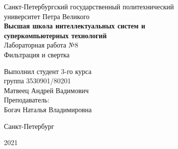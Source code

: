 \documentclass[a4paper]{article}
\begin{document}
    \begin{center}
        \begin{center}
        \hfill \break
        \normalsize{Санкт-Петербургский государственный политехнический}\\
        \normalsize{университет Петра Великого}\\
        \hfill \break
        \normalsize{\textbf{Высшая школа интеллектуальных систем и}}\\ 
        \normalsize{\textbf{суперкомпьютерных технологий}}\\ 
        \hfill \break
        \hfill \break
        \hfill \break
        \normalsize{Лабораторная работа №8}\\
        \hfill \break
        \hfill \break
        \normalsize{\LARGE Фильтрация и свертка}\\
        \end{center}
        \hfill \break
        \hfill \break
        \hfill \break
        \hfill \break
        \hfill \break
        \hfill \break
        \hfill \break
        \hfill \break
        \hfill \break
        \hfill \break
        \begin{flushright}
            \normalsize{Выполнил студент 3-го курса}\\
            \normalsize{группа 3530901/80201}\\
            \normalsize{Матвеец Андрей Вадимович}\\
            \hfill \break
            \normalsize{Преподаватель:}\\
            \normalsize{Богач Наталья Владимировна}\\
        \end{flushright}
        \hfill \break
        \hfill \break
        \hfill \break
        \hfill \break
        \begin{center} Санкт-Петербург\end{center}
        \begin{center}2021\end{center} 
        \thispagestyle{empty}
    \end{center}
    
    \newpage
        \tableofcontents
    
    \newpage
         \listoffigures
    
    \newpage
         \lstlistoflistings   
     
\end{document}
